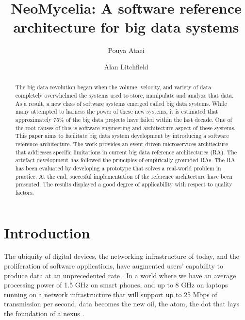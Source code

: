 \documentclass[runningheads]{llncs}
\begin{document}
%
\title{NeoMycelia: A software reference architecture for big data systems}
%
%
\author{Pouya Ataei \and
    Alan Litchfield}
%
%

\maketitle              %
%
\begin{abstract}
    The big data revolution began when the volume, velocity, and variety of data completely overwhelmed the systems used to store, manipulate and analyze that data. As a result, a new class of software systems emerged called big data systems. While many attempted to harness the power of these new systems, it is estimated that approximately 75\% of the big data projects have failed within the last decade. One of the root causes of this is software engineering and architecture aspect of these systems. This paper aims to facilitate big data system development by introducing a software reference architecture. The work provides an event driven microservices architecture that addresses specific limitations in current big data reference architectures (RA). The artefact development has followed the principles of empirically grounded RAs. The RA has been evaluated by developing a prototype that solves a real-world problem in practice. At the end, succesful implementation of the reference architecture have been presented. The results displayed a good degree of applicability with respect to quality factors.

\end{abstract}
%
%
%
\section{Introduction}
The ubiquity of digital devices, the networking infrastructure of today, and the proliferation of software applications, have augmented users’ capability to produce data at an unprecedented rate \cite{AtaeiHype}. In a world where we have an average processing power of 1.5 GHz on smart phones, and up to 8 GHz on laptops running on a network infrastructure that will support up to 25 Mbps of transmission per second, data becomes the new oil, the atom, the dot that lays the foundation of a nexus \cite{Shafi}.
\end{document}
